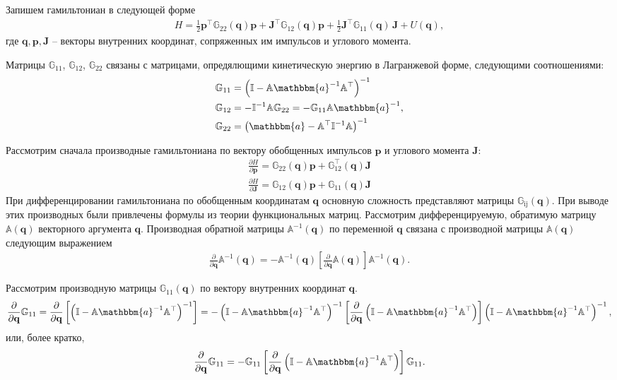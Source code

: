 \documentclass[12pt]{article}
\newcommand{\mf}{\mathbf}
\newcommand{\lb}{\left(}
\newcommand{\rb}{\right)}
\newcommand{\bbI}{\mathbb{I}}
\newcommand{\bba}{\mathbbm{a}}
\newcommand{\bbA}{\mathbb{A}}
\newcommand{\bbG}{\mathbb{G}}
\begin{document}
Запишем гамильтониан в следующей форме
\begin{gather}
    H = \frac{1}{2} \mf{p}^\top \bbG_{22} \lb \mf{q} \rb \mf{p} + \mf{J}^\top \bbG_{12} \lb \mf{q} \rb \mf{p} + \frac{1}{2} \mf{J}^\top \bbG_{11} \lb \mf{q} \rb \,\mf{J} + U(\mf{q}), \label{eq:hamiltonian}
\end{gather}
где $\mf{q}, \mf{p}, \mf{J}$ -- векторы внутренних координат, сопряженных им импульсов и углового момента. 

Матрицы $\bbG_{11}$, $\bbG_{12}$, $\bbG_{22}$ связаны с матрицами, опредялющими кинетическую энергию в Лагранжевой форме, следующими соотношениями:
\begin{gather}
	\begin{aligned}
		\bbG_{11} &= \lb \bbI - \bbA \bba^{-1} \bbA^\top \rb^{-1} \\ 
		\bbG_{12} &= -\bbI^{-1} \bbA \bbG_{22} = - \bbG_{11} \bbA \bba^{-1}, \\
		\bbG_{22} &= \lb \bba - \bbA^\top \bbI^{-1} \bbA \rb^{-1}
\end{aligned}
	\label{eq:Gmatrices}
\end{gather}

Рассмотрим сначала производные гамильтониана по вектору обобщенных импульсов $\mf{p}$ и углового момента $\mf{J}$: 
\begin{gather}
    \frac{\partial H}{\partial \mf{p}} = \bbG_{22}(\mf{q}) \mf{p} + \bbG_{12}^\top (\mf{q}) \mf{J} \\ 
    \frac{\partial H}{\partial \mf{J}} = \bbG_{12}(\mf{q}) \mf{p} + \bbG_{11}(\mf{q}) \mf{J}
\end{gather}
При дифференцировании гамильтониана по обобщенным координатам $\mf{q}$ основную сложность представляют матрицы $\bbG_\text{ij}(\mf{q})$. При выводе этих производных были привлечены формулы из теории функциональных матриц.
Рассмотрим дифференцируемую, обратимую матрицу $\bbA(\mf{q})$ векторного аргумента $\mf{q}$. Производная обратной матрицы $\bbA^{-1}(\mf{q})$ по переменной $\mf{q}$ связана с производной матрицы $\bbA(\mf{q})$ следующим выражением 
\begin{gather}
		\frac{\partial}{\partial \mf{q}} \bbA^{-1}(\mf{q}) = -\bbA^{-1}(\mf{q})\left[ \frac{\partial}{\partial \mf{q}} \bbA(\mf{q}) \right] \bbA^{-1} (\mf{q}). 
\end{gather}

Рассмотрим производную матрицы $\bbG_{11}(\mf{q})$ по вектору внутренних координат $\mf{q}$. 
\begin{gather}
	\frac{\partial}{\partial \mf{q}} \bbG_{11} = \frac{\partial}{\partial \mf{q}} \left[ \lb \bbI - \bbA \bba^{-1} \bbA^\top \rb^{-1} \right] = - \lb \bbI - \bbA \bba^{-1} \bbA^\top \rb^{-1} \left[ \frac{\partial}{\partial \mf{q}} \lb \bbI - \bbA \bba^{-1} \bbA^\top \rb \right] \lb \bbI - \bbA \bba^{-1} \bbA^\top \rb^{-1}, 
\end{gather}
или, более кратко,
\begin{gather}
	\frac{\partial}{\partial \mf{q}} \bbG_{11} = - \bbG_{11} \left[ \frac{\partial}{\partial \mf{q}} \lb \bbI - \bbA \bba^{-1} \bbA^\top \rb \right] \bbG_{11}. \label{eq:diffG11}
\end{gather}
\end{document}
